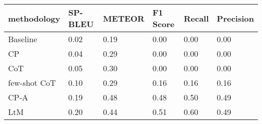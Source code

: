 \begin{tabular}{llllll}
\toprule
methodology & SP-BLEU & METEOR & F1 Score & Recall & Precision \\
\midrule
Baseline & 0.02 & 0.19 & 0.00 & 0.00 & 0.00 \\
CP & 0.04 & 0.29 & 0.00 & 0.00 & 0.00 \\
CoT & 0.05 & 0.30 & 0.00 & 0.00 & 0.00 \\
few-shot CoT & 0.10 & 0.29 & 0.16 & 0.16 & 0.16 \\
CP-A & 0.19 & 0.48 & 0.48 & 0.50 & 0.49 \\
LtM & 0.20 & 0.44 & 0.51 & 0.60 & 0.49 \\
\bottomrule
\end{tabular}
